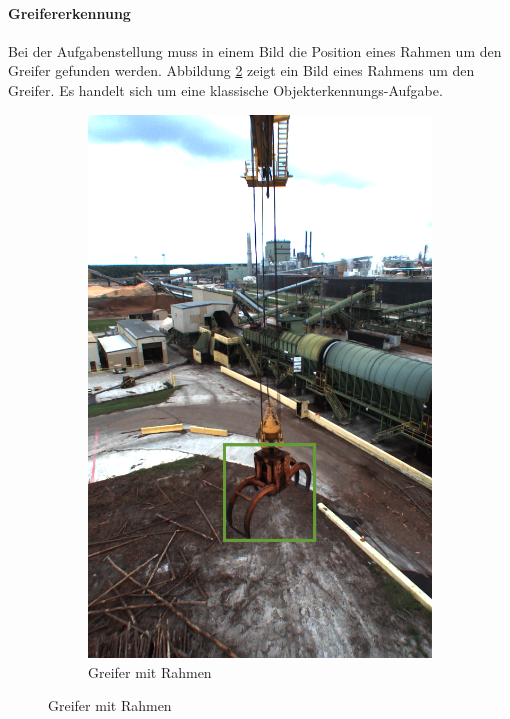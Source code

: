 	\paragraph{Greifererkennung} Bei der Aufgabenstellung muss in einem Bild die Position eines Rahmen um den Greifer gefunden werden. Abbildung \ref{img:Grapple} zeigt ein Bild eines Rahmens um den Greifer. Es handelt sich um eine klassische Objekterkennungs-Aufgabe.
	\begin{figure}[h]
		\centering
		\begin{subfigure}[c]{0.49\textwidth}			
			\includegraphics[width=1\textwidth, center]{bilder/Grundlagen/Grapple_8.png}
			\caption[Bsp. Bild: Greifer mit Rahmen]{Greifer mit Rahmen}
			\label{img:Grapple}	

\end{subfigure}
\end{figure}

